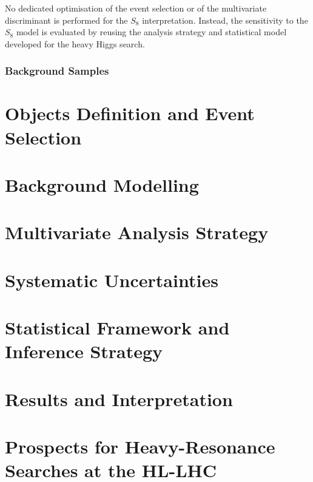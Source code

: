 \begin{description}
No dedicated optimisation of the event selection or of the multivariate
discriminant is performed for the $S_{8}$ interpretation.
Instead, the sensitivity to the $S_{8}$ model is evaluated by reusing the
analysis strategy and statistical model developed for the heavy Higgs
search.
\end{description}

\subsubsection{Background Samples}
\label{subsec:background_samples}


\section{Objects Definition and Event Selection}
\label{subsec:objects_selection}


\section{Background Modelling}
\label{subsec:background_modelling}


\section{Multivariate Analysis Strategy}
\label{subsec:multivariate_strategy}


\section{Systematic Uncertainties}
\label{subsec:systematic_uncertainties}


\section{Statistical Framework and Inference Strategy}
\label{subsec:statistical_framework}


\section{Results and Interpretation}
\label{subsec:results_interpretation}


\section{Prospects for Heavy-Resonance Searches at the HL-LHC}
\label{subsec:HL-LHC_prospects}


